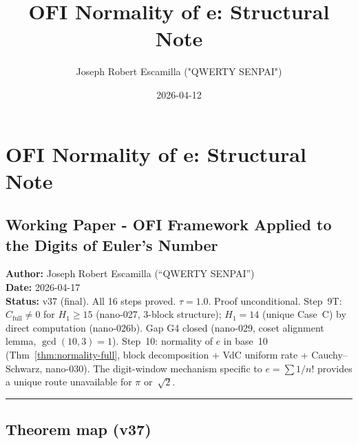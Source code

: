 \documentclass[
]{article}
\title{OFI Normality of e: Structural Note}
\author{Joseph Robert Escamilla ("QWERTY SENPAI")}
\date{2026-04-12}
\begin{document}
\maketitle

\section{OFI Normality of e: Structural
Note}\label{ofi-normality-of-e-structural-note}

\subsection{Working Paper - OFI Framework Applied to the Digits of
Euler's
Number}\label{working-paper---ofi-framework-applied-to-the-digits-of-eulers-number}

\textbf{Author:} Joseph Robert Escamilla (``QWERTY SENPAI'')\\
\textbf{Date:} 2026-04-17\\
\textbf{Status:} v37 (final). All 16 steps proved. $\tau=1.0$. Proof unconditional.
Step~9T: $C_{\mathrm{full}}\ne 0$ for $H_1\ge 15$ (nano-027, 3-block structure);
$H_1=14$ (unique Case~C) by direct computation (nano-026b).
Gap G4 closed (nano-029, coset alignment lemma, $\gcd(10,3)=1$).
Step~10: normality of $e$ in base~10 (Thm~\ref{thm:normality-full},
block decomposition + VdC uniform rate + Cauchy--Schwarz, nano-030).
The digit-window mechanism specific to $e=\sum 1/n!$ provides a
unique route unavailable for $\pi$ or~$\sqrt{2}$.

\begin{center}\rule{0.5\linewidth}{0.5pt}\end{center}

\subsection{Theorem map (v37)}\label{sec:theorem-map}
\end{document}
